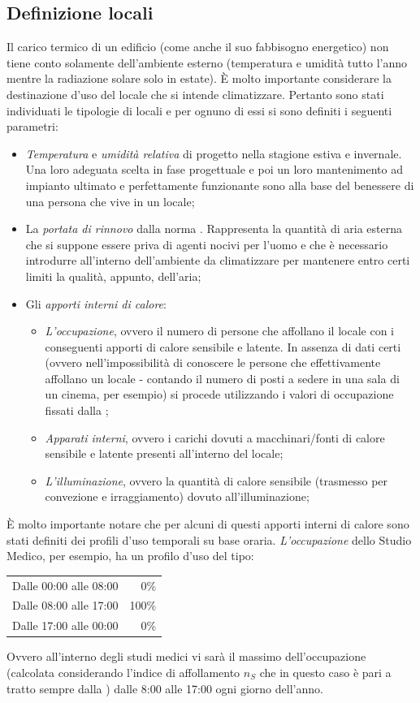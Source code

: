\subsection{Definizione locali}
Il carico termico di un edificio (come anche il suo fabbisogno energetico) non tiene conto solamente dell'ambiente esterno (temperatura e umidità tutto l'anno mentre la radiazione solare solo in estate). È molto importante considerare la destinazione d'uso del locale che si intende climatizzare. Pertanto sono stati individuati le tipologie di locali e per ognuno di essi si sono definiti i seguenti parametri:
\begin{itemize}
	\item \emph{Temperatura} e \emph{umidità relativa} di progetto nella stagione estiva e invernale. Una loro adeguata scelta in fase progettuale e poi un loro mantenimento ad impianto ultimato e perfettamente funzionante sono alla base del benessere di una persona che vive in un locale;
	\item La \emph{portata di rinnovo} dalla norma \norvent. Rappresenta la quantità di aria esterna che si suppone essere priva di agenti nocivi per l'uomo e che è necessario introdurre all'interno dell'ambiente da climatizzare per mantenere entro certi limiti la qualità, appunto, dell'aria;
	\item Gli \emph{apporti interni di calore}:
	\begin{itemize}
		\item \emph{L'occupazione}, ovvero il numero di persone che affollano il locale con i conseguenti apporti di calore sensibile e latente. In assenza di dati certi (ovvero nell'impossibilità di conoscere le persone che effettivamente affollano un locale - contando il numero di posti a sedere in una sala di un cinema, per esempio) si procede utilizzando i valori di occupazione fissati dalla \norvent;
		\item \emph{Apparati interni}, ovvero i carichi dovuti a macchinari/fonti di calore sensibile e latente presenti all'interno del locale;
		\item \emph{L'illuminazione}, ovvero la quantità di calore sensibile (trasmesso per convezione e irraggiamento) dovuto all'illuminazione;
	\end{itemize}
\end{itemize}
È molto importante notare che per alcuni di questi apporti interni di calore sono stati definiti dei profili d'uso temporali su base oraria. \emph{L'occupazione} dello Studio Medico, per esempio, ha un profilo d'uso del tipo:
\begin{center}
	\begin{tabular}{lr}
		\toprule
		Dalle 00:00 alle 08:00 & 0\% \\
		Dalle 08:00 alle 17:00 & 100\% \\
		Dalle 17:00 alle 00:00 & 0\% \\
		\bottomrule
	\end{tabular}
\end{center}
Ovvero all'interno degli studi medici vi sarà il massimo dell'occupazione (calcolata considerando l'indice di affollamento $n_S$ che in questo caso è pari a  tratto sempre dalla \norvent) dalle 8:00 alle 17:00 ogni giorno dell'anno.

